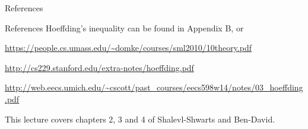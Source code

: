 \documentclass[10pt, table, handout]{beamer}
\begin{document}
\begin{frame}[fragile]{References}

References Hoeffding's inequality can be found in Appendix B, or 

\url{https://people.cs.umass.edu/~domke/courses/sml2010/10theory.pdf}

\url{http://cs229.stanford.edu/extra-notes/hoeffding.pdf}

\url{http://web.eecs.umich.edu/~cscott/past_courses/eecs598w14/notes/03_hoeffding.pdf}

This lecture covers chapters 2, 3 and 4 of Shalevl-Shwarts and Ben-David.
\end{frame}
\end{document}
